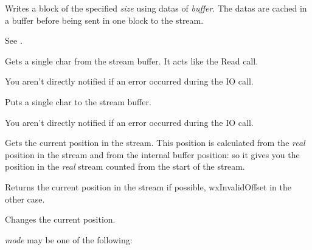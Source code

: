 
Writes a block of the specified {\it size} using datas of {\it buffer}. The datas
are cached in a buffer before being sent in one block to the stream.


See .



Gets a single char from the stream buffer. It acts like the Read call.


You aren't directly notified if an error occurred during the IO call.





Puts a single char to the stream buffer.


You aren't directly notified if an error occurred during the IO call.





Gets the current position in the stream. This position is calculated from
the {\it real} position in the stream and from the internal buffer position: so
it gives you the position in the {\it real} stream counted from the start of
the stream.


Returns the current position in the stream if possible, wxInvalidOffset in the
other case.

\label{wxstreambufferseek}


Changes the current position.

{\it mode} may be one of the following:

